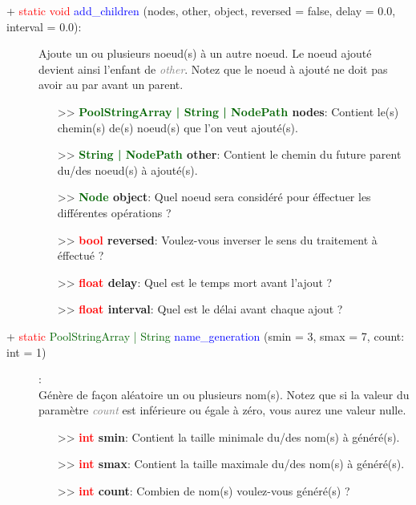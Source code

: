 \documentclass[a4paper, 11pt]{article}
\begin{document}
	\begin{description}
		\item [+ \textcolor{red}{static void} \textcolor{blue}{add\_children} (nodes, other, object, 
		reversed = false, delay = 0.0, interval = 0.0):] Ajoute un ou plusieurs noeud(s) à un autre noeud. 
		Le noeud ajouté devient ainsi l'enfant de \textit{\textcolor{gray}{other}}. Notez que le noeud à 
		ajouté ne doit pas avoir au par avant un parent.
		\begin{itemize}
			\item [>> \textbf{\textcolor{darkgreen}{PoolStringArray | String | NodePath} nodes}:] Contient 
			le(s) chemin(s) de(s) noeud(s) que l'on veut ajouté(s).
			\item [>> \textbf{\textcolor{darkgreen}{String | NodePath} other}:] Contient le chemin du future 
			parent du/des noeud(s) à ajouté(s).
			\item [>> \textbf{\textcolor{darkgreen}{Node} object}:] Quel noeud sera considéré pour éffectuer
			les différentes opérations ?
			\item [>> \textbf{\textcolor{red}{bool} reversed}:] Voulez-vous inverser le sens du traitement à 
			éffectué ?
			\item [>> \textbf{\textcolor{red}{float} delay}:] Quel est le temps mort avant l'ajout ?
			\item [>> \textbf{\textcolor{red}{float} interval}:] Quel est le délai avant chaque ajout ?\\
		\end{itemize}
	\end{description}
	\begin{description}
		\item [+ \textcolor{red}{static} \textcolor{darkgreen}{PoolStringArray | String} \textcolor{blue}
		{name\_generation} (smin = 3, smax = 7, count: int = 1)]: \\Génère de façon aléatoire un ou 
		plusieurs nom(s). Notez que si la valeur du paramètre \textit{\textcolor{gray}{count}} est 
		inférieure ou égale à zéro, vous aurez une valeur nulle.
		\begin{itemize}
			\item [>> \textbf{\textcolor{red}{int} smin}:] Contient la taille minimale du/des nom(s) à 
			généré(s).
			\item [>> \textbf{\textcolor{red}{int} smax}:] Contient la taille maximale du/des nom(s) à 
			généré(s).
			\item [>> \textbf{\textcolor{red}{int} count}:] Combien de nom(s) voulez-vous généré(s) ?\\
		\end{itemize}
	\end{description}
\end{document}
